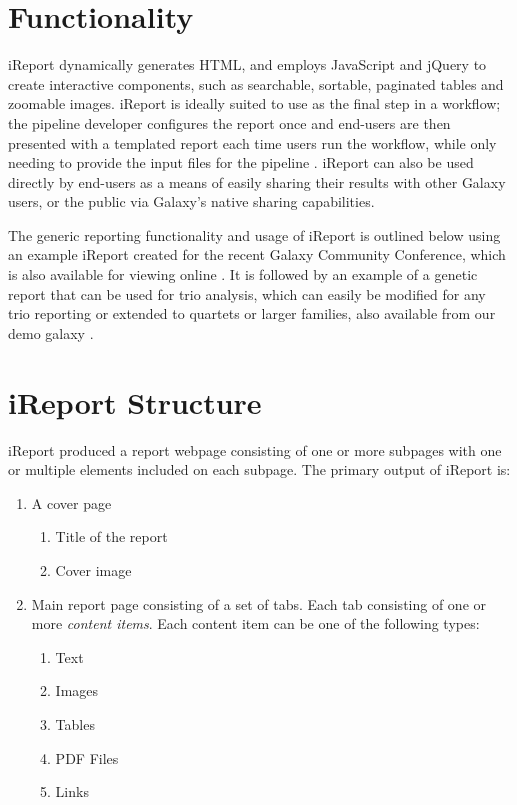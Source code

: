 \section*{Functionality}
iReport dynamically generates HTML, and employs JavaScript and jQuery to create interactive components, such as searchable, sortable, paginated tables and zoomable images. iReport is ideally suited to use as the final step in a workflow; the pipeline developer configures the report once and end-users are then presented with a templated report each time users run the workflow, while only needing to provide the input files for the pipeline \cite{CGtagpipeline}. iReport can also be used directly by end-users as a means of easily sharing their results with other Galaxy users, or the public via Galaxy's native sharing capabilities.

The generic reporting functionality and usage of iReport is outlined below using an example iReport created for the recent Galaxy Community Conference, which is also available for viewing online \cite{url-ireport-tutorial}. It is followed by an example of a genetic report that can be used for trio analysis, which can easily be modified for any trio reporting or extended to quartets or larger families, also available from our demo galaxy \cite{url-genetic-ireport}.

\section*{iReport Structure}

iReport produced a report webpage consisting of one or more subpages with one or multiple elements included on each subpage. The primary output of iReport is:


\begin{enumerate}
 \item A cover page
  \begin{enumerate}
    \item Title of the report
    \item Cover image
  \end{enumerate}
 \item Main report page consisting of a set of tabs. Each tab consisting of one or more \emph{content items}. Each content item can be one of the following types:
  \begin{enumerate}
    \item Text
    \item Images
    \item Tables
    \item PDF Files
    \item Links
  \end{enumerate}
\end{enumerate}

